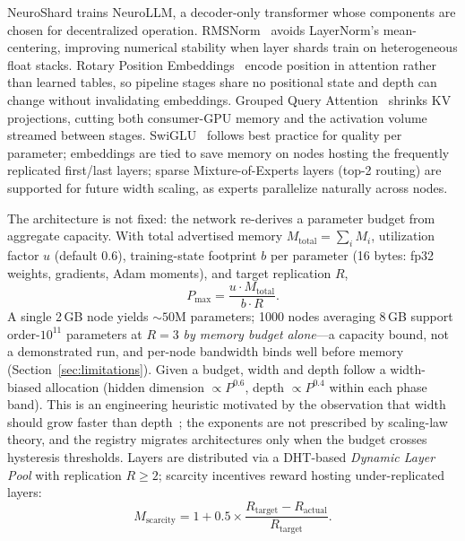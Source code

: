 \documentclass[conference]{IEEEtran}
\begin{document}
NeuroShard trains NeuroLLM, a decoder-only transformer whose components are chosen for decentralized operation. RMSNorm~\cite{zhang2019root} avoids LayerNorm's mean-centering, improving numerical stability when layer shards train on heterogeneous float stacks. Rotary Position Embeddings~\cite{su2021roformer} encode position in attention rather than learned tables, so pipeline stages share no positional state and depth can change without invalidating embeddings. Grouped Query Attention~\cite{ainslie2023gqa} shrinks KV projections, cutting both consumer-GPU memory and the activation volume streamed between stages. SwiGLU~\cite{shazeer2020glu} follows best practice for quality per parameter; embeddings are tied to save memory on nodes hosting the frequently replicated first/last layers; sparse Mixture-of-Experts layers (top-2 routing) are supported for future width scaling, as experts parallelize naturally across nodes.

The architecture is not fixed: the network re-derives a parameter budget from aggregate capacity. With total advertised memory $M_{\text{total}} = \sum_i M_i$, utilization factor $u$ (default 0.6), training-state footprint $b$ per parameter (16 bytes: fp32 weights, gradients, Adam moments), and target replication $R$,
\begin{equation}
P_{\max} = \frac{u \cdot M_{\text{total}}}{b \cdot R}. \label{eq:budget}
\end{equation}
A single 2\,GB node yields ${\sim}50$M parameters; 1000 nodes averaging 8\,GB support order-$10^{11}$ parameters at $R{=}3$ \emph{by memory budget alone}---a capacity bound, not a demonstrated run, and per-node bandwidth binds well before memory (Section~\ref{sec:limitations}). Given a budget, width and depth follow a width-biased allocation (hidden dimension ${\propto}P^{0.6}$, depth ${\propto}P^{0.4}$ within each phase band). This is an engineering heuristic motivated by the observation that width should grow faster than depth~\cite{kaplan2020scaling,hoffmann2022training}; the exponents are not prescribed by scaling-law theory, and the registry migrates architectures only when the budget crosses hysteresis thresholds. Layers are distributed via a DHT-based \emph{Dynamic Layer Pool} with replication $R \geq 2$; scarcity incentives reward hosting under-replicated layers:
\begin{equation}
M_{\text{scarcity}} = 1 + 0.5 \times \frac{R_{\text{target}} - R_{\text{actual}}}{R_{\text{target}}}. \label{eq:scarcity}
\end{equation}
\end{document}
